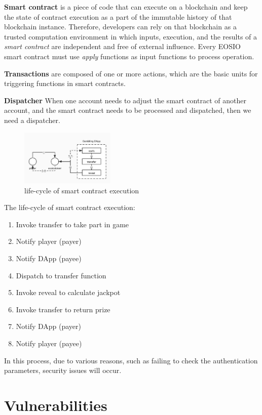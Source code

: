 \documentclass[a4paper, 10pt, conference, twocolumn]{ieeeconf}       %
\begin{document}
\textbf{Smart contract} is a piece of code that can execute on a blockchain and keep the state of contract execution as a part of the immutable history of that blockchain instance.
Therefore, developers can rely on that blockchain as a trusted computation environment in which inputs, execution, and the results of a \emph{smart contract} are independent and free of external influence.
Every EOSIO smart contract must use \emph{apply} functions as input functions to process operation.

\textbf{Transactions} are composed of one or more actions, which are the basic units for triggering functions in smart contracts.

\textbf{Dispatcher} When one account needs to adjust the smart contract of another account, and the smart contract needs to be processed and dispatched, then we need a dispatcher.

\begin{figure}[h]
    \centering
    \includegraphics[width=0.4\textwidth]{figures/life-cycle.jpg}
    \caption{life-cycle of smart contract execution\cite{272292}\cite{eos:transactions_protocol}}
\end{figure}

The life-cycle of smart contract execution\cite{272292}:
\begin{enumerate}
    \item Invoke transfer to take part in game
    \item Notify player (payer)
    \item Notify DApp (payee)
    \item Dispatch to transfer function
    \item Invoke reveal to calculate jackpot
    \item Invoke transfer to return prize
    \item Notify DApp (payer) 
    \item Notify player (payee)
\end{enumerate}

In this process, due to various reasons, such as failing to check the authentication parameters, security issues will occur.

\section{Vulnerabilities}
\end{document}
